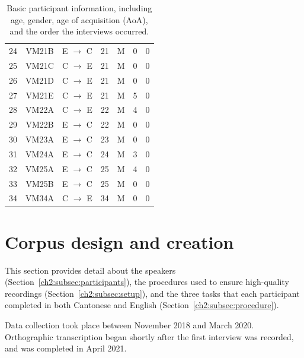 \begin{table}[!htbp]
\begin{center}
\begin{tabular}{ccccccc}
24  & VM21B & E $\rightarrow$ C & 21  & M & 0   & 0 \\
25  & VM21C & C $\rightarrow$ E & 21  & M & 0   & 0 \\
26  & VM21D & C $\rightarrow$ E & 21  & M & 0   & 0 \\
27  & VM21E & C $\rightarrow$ E & 21  & M & 5   & 0 \\
28  & VM22A & C $\rightarrow$ E & 22  & M & 4   & 0 \\
29  & VM22B & E $\rightarrow$ C & 22  & M & 0   & 0 \\
30  & VM23A & E $\rightarrow$ C & 23  & M & 0   & 0 \\
31  & VM24A & E $\rightarrow$ C & 24  & M & 3   & 0 \\
32  & VM25A & E $\rightarrow$ C & 25  & M & 4   & 0 \\
33  & VM25B & E $\rightarrow$ C & 25  & M & 0   & 0 \\
34  & VM34A & C $\rightarrow$ E & 34  & M & 0   & 0 \\
\bottomrule

\end{tabular}
\caption{Basic participant information, including age, gender, age of acquisition (AoA), and the order the interviews occurred.}
\label{ch2:tab:participants}
\end{center}
\end{table}

\section{Corpus design and creation}\label{ch2:sec:design}

This section provides detail about the speakers (Section~\ref{ch2:subsec:participants}), the procedures used to ensure high-quality recordings (Section~\ref{ch2:subsec:setup}), and the three tasks that each participant completed in both Cantonese and English (Section~\ref{ch2:subsec:procedure}). 

Data collection took place between November 2018 and March 2020. Orthographic transcription began shortly after the first interview was recorded, and was completed in April 2021.

